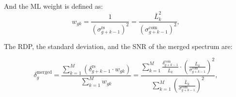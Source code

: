 


And the ML weight is defined as: 
\begin{equation}
    \label{eq:merge_weight}
    w_{gk} = \frac{1}{(\sigma_{g+k-1}^\text{rs})^{2}} = \frac{\bar{L}_{k}^{2}}{(\sigma_{g+k-1}^\text{com})^{2}},
\end{equation}




The RDP, the standard deviation, and the SNR of the merged spectrum are:

\begin{equation}
    \delta_{g}^\text{merged} = \frac{ \sum\limits_{k = 1}^{M}\left(\delta_{g+k-1}^\text{rs} \cdot {w_{gk}}\right)}{\sum\limits_{k = 1}^{M} {w_{gk}}} = \frac{\sum\limits_{k = 1}^{M}\frac{\delta_{g+k-1}^\text{com}}{\bar{L}_{k}} \cdot \left(\frac{\bar{L}_{k}}{\sigma_{g+k-1}^\text{com}}\right)^2} {\sum\limits_{k = 1}^{M}\left(\frac{\bar{L}_{k}}{\sigma_{g+k-1}^\text{com}}\right)^2},
    \label{eq:merged_power}
\end{equation}

